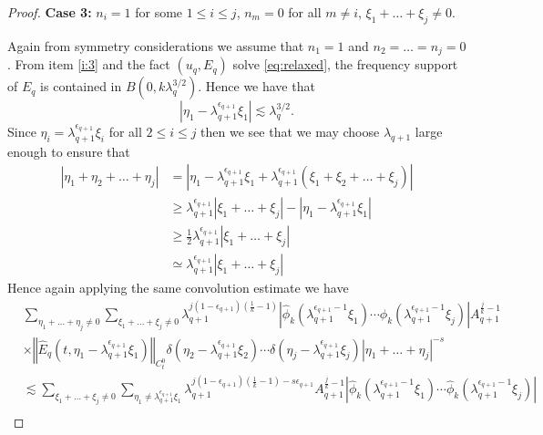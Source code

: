 \documentclass[10pt,a4paper]{amsart}
\begin{document}
\begin{proof}
    \textbf{Case 3:} $n_i = 1$ for some $1 \leq i \leq j$, $n_m=0$ for all $m \not=i$, $\xi_1 + \ldots + \xi_j \not= 0$.

    Again from symmetry considerations we assume that $n_1 = 1$ and $n_2 = \ldots = n_j = 0$. From item \ref{i:3} and the fact $(u_q,E_q)$ solve \eqref{eq:relaxed}, the frequency support of $E_q$ is contained in $B(0,k\lambda_q^{3/2})$. Hence we have that
    $$
    |\eta_1 - \lambda_{q+1}^{\epsilon_{q+1}} \xi_1| \lesssim \lambda_q^{3/2}.
    $$
    Since $\eta_i = \lambda_{q+1}^{\epsilon_{q+1}} \xi_i$ for all $2 \leq i \leq j$ then we see that we may choose $\lambda_{q+1}$ large enough to ensure that
    \begin{equation}\label{eq:AF-case3-gap}
        \begin{split}
            |\eta_1 + \eta_2 + \ldots + \eta_j| &= \left|\eta_1 - \lambda_{q+1}^{\epsilon_{q+1}} \xi_1 + \lambda_{q+1}^{\epsilon_{q+1}}\left(\xi_1 + \xi_2 + \ldots + \xi_j\right)\right|\\
            &\geq \lambda_{q+1}^{\epsilon_{q+1}} \left|\xi_1 + \ldots + \xi_j\right| - |\eta_1 - \lambda_{q+1}^{\epsilon_{q+1}} \xi_1|\\
            &\geq \frac{1}{2}\lambda_{q+1}^{\epsilon_{q+1}} \left|\xi_1 + \ldots + \xi_j\right|\\
            &\simeq \lambda_{q+1}^{\epsilon_{q+1}} \left|\xi_1 + \ldots + \xi_j\right|
        \end{split}
    \end{equation}
    Hence again applying the same convolution estimate we have
    \begin{equation}\label{eq:n=1_case_2}
        \begin{split}
            &\sum_{\eta_1 + \ldots + \eta_j \not=0} \sum_{\xi_1 + \ldots + \xi_j \not= 0} \lambda_{q+1}^{j(1-\epsilon_{q+1})\left(\frac{1}{k} - 1\right)} \left|\hat{\phi}_k\left(\lambda_{q+1}^{\epsilon_{q+1}-1}\xi_1\right) \cdots \hat{\phi}_k\left(\lambda_{q+1}^{\epsilon_{q+1}-1}\xi_j\right)\right| A_{q+1}^{\frac{j}{k}-1}\\
           &\times \left\Vert \hat{E}_q(t,\eta_1 - \lambda_{q+1}^{\epsilon_{q+1}} \xi_1)\right\Vert_{C_t^0}\delta(\eta_2 - \lambda_{q+1}^{\epsilon_{q+1}} \xi_2) \cdots \delta(\eta_j - \lambda_{q+1}^{\epsilon_{q+1}} \xi_j) |\eta_1 + \ldots + \eta_j|^{-s}\\
           &\lesssim  \sum_{\xi_1 + \ldots + \xi_j \not=0} \sum_{\eta_1 \not= \lambda_{q+1}^{\epsilon_{q+1}} \xi_1} \lambda_{q+1}^{j(1-\epsilon_{q+1})\left(\frac{1}{k}-1\right)-s\epsilon_{q+1}} A_{q+1}^{\frac{j}{k}-1} \left|\hat{\phi}_k\left(\lambda_{q+1}^{\epsilon_{q+1}-1}\xi_1\right) \cdots \hat{\phi}_k\left(\lambda_{q+1}^{\epsilon_{q+1}-1}\xi_j\right)\right|\\

\end{split}
\end{equation}
\end{proof}
\end{document}
